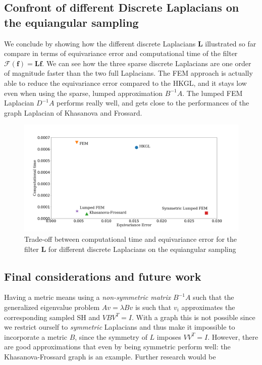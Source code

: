 \subsection{Confront of different Discrete Laplacians on the equiangular sampling}
We conclude by showing how the different discrete Laplacians $\mathbf L$ illustrated so far compare in terms of equivariance error and computational time of the filter $\mathcal F(\mathbf f) = \mathbf L\mathbf f$. We can see how the three sparse discrete Laplacians are one order of magnitude faster than the two full Laplacians. The FEM approach is actually able to reduce the equivariance error compared to the HKGL, and it stays low even when using the sparse, lumped approximation $B^{-1}A$. The lumped FEM Laplacian $D^{-1}A$ performs really well, and gets close to the performances of the graph Laplacian of Khasanova and Frossard. 
\begin{figure}[h!]
	\centering
	\includegraphics[width=\textwidth]{../codes/06.Equivariance_error/tradeoff.png}
	\caption{\label{fig:tradeoff}Trade-off between computational time and equivariance error for the filter $\mathbf L$ for different discrete Laplacians on the equiangular sampling}
\end{figure}

\subsection{Final considerations and future work}


Having a metric means using a \textit{non-symmetric matrix} $B^{-1}A$ such that the generalized eigenvalue problem $Av = \lambda B v$ is such that $v_i$ approximates the corresponding sampled SH and $VBV^T=I$. With a graph this is not possible since we restrict ourself to \textit{symmetric} Laplacians and thus make it impossible to incorporate a metric $B$, since the symmetry of $L$ imposes $VV^T=I$. However, there are good approximations that even by being symmetric perform well: the Khasanova-Frossard graph is an example. Further research would be 